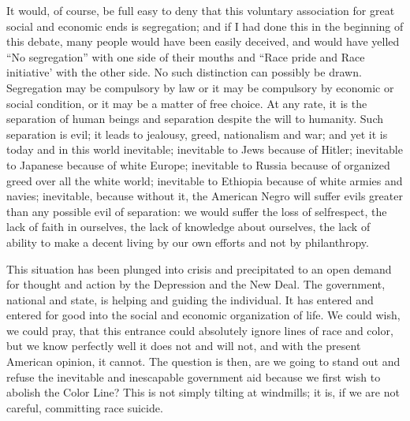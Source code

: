\documentclass[letterpaper,10pt,english]{jupyterBook}
\begin{document}
\sphinxAtStartPar
It would, of course, be full easy to deny that this voluntary association for great social and economic ends is segregation; and if I had done this in the beginning of this debate, many people would have been easily deceived, and would have yelled “No segregation” with one side of their mouths and “Race pride and Race initiative’ with the other side. No such distinction can possibly be drawn. Segregation may be compulsory by law or it may be compulsory by economic or social condition, or it may be a matter of free choice. At any rate, it is the separation of human beings and separation despite the will to humanity. Such separation is evil; it leads to jealousy, greed, nationalism and war; and yet it is today and in this world inevitable; inevitable to Jews because of Hitler; inevitable to Japanese because of white Europe; inevitable to Russia because of organized greed over all the white world; inevitable to Ethiopia because of white armies and navies; inevitable, because without it, the American Negro will suffer evils greater than any possible evil of separation: we would suffer the loss of self\sphinxhyphen{}respect, the lack of faith in ourselves, the lack of knowledge about ourselves, the lack of ability to make a decent living by our own efforts and not by philanthropy.

\sphinxAtStartPar
This situation has been plunged into crisis and precipitated to an open demand for thought and action by the Depression and the New Deal. The government, national and state, is helping and guiding the individual. It has entered and entered for good into the social and economic organization of life. We could wish, we could pray, that this entrance could absolutely ignore lines of race and color, but we know perfectly well it does not and will not, and with the present American opinion, it cannot. The question is then, are we going to stand out and refuse the inevitable and inescapable government aid because we first wish to abolish the Color Line? This is not simply tilting at windmills; it is, if we are not careful, committing race suicide.
\end{document}
